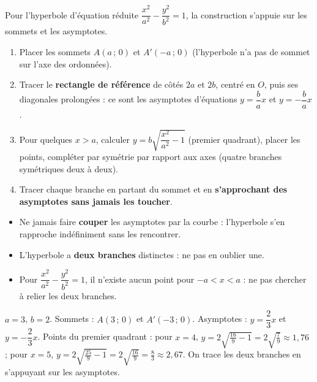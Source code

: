 \documentclass[11pt]{article}
\newcommand{\cle}[1]{{\popxbold\color{popdark}#1}}
\begin{document}
Pour l'hyperbole d'équation réduite $\dfrac{x^2}{a^2} - \dfrac{y^2}{b^2} = 1$, la construction s'appuie sur les \cle{sommets} et les \cle{asymptotes}.

\begin{methode}
\begin{enumerate}
\item Placer les sommets $A(a\,;\,0)$ et $A'(-a\,;\,0)$ (l'hyperbole n'a pas de sommet sur l'axe des ordonnées).
\item Tracer le \textbf{rectangle de référence} de côtés $2a$ et $2b$, centré en $O$, puis ses diagonales prolongées : ce sont les asymptotes d'équations $y = \dfrac{b}{a}x$ et $y = -\dfrac{b}{a}x$.
\item Pour quelques $x > a$, calculer $y = b\sqrt{\dfrac{x^2}{a^2} - 1}$ (premier quadrant), placer les points, compléter par symétrie par rapport aux axes (quatre branches symétriques deux à deux).
\item Tracer chaque branche en partant du sommet et en \textbf{s'approchant des asymptotes sans jamais les toucher}.
\end{enumerate}
\end{methode}

\begin{attention}
\begin{itemize}
\item Ne jamais faire \textbf{couper} les asymptotes par la courbe : l'hyperbole s'en rapproche indéfiniment sans les rencontrer.
\item L'hyperbole a \textbf{deux branches} distinctes : ne pas en oublier une.
\item Pour $\dfrac{x^2}{a^2} - \dfrac{y^2}{b^2} = 1$, il n'existe aucun point pour $-a < x < a$ : ne pas chercher à relier les deux branches.
\end{itemize}
\end{attention}

\begin{exemplebox}[Hyperbole $\dfrac{x^2}{9} - \dfrac{y^2}{4} = 1$]
$a = 3$, $b = 2$. Sommets : $A(3\,;\,0)$ et $A'(-3\,;\,0)$. Asymptotes : $y = \dfrac{2}{3}x$ et $y = -\dfrac{2}{3}x$. Points du premier quadrant : pour $x = 4$, $y = 2\sqrt{\tfrac{16}{9}-1} = 2\sqrt{\tfrac{7}{9}} \approx 1{,}76$ ; pour $x = 5$, $y = 2\sqrt{\tfrac{25}{9}-1} = 2\sqrt{\tfrac{16}{9}} = \tfrac{8}{3} \approx 2{,}67$. On trace les deux branches en s'appuyant sur les asymptotes.
\end{exemplebox}
\end{document}
